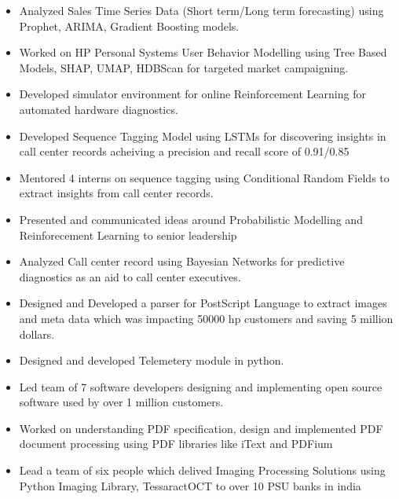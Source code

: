 \documentclass[10pt,a4paper,ragged2e,withhyper]{altacv}
\begin{document}
\begin{paracol}{1}
\par\divider
{}

\begin{itemize}
\item Analyzed Sales Time Series Data (Short term/Long term forecasting) using
Prophet, ARIMA, Gradient Boosting models.
\item Worked on HP Personal Systems User Behavior Modelling using Tree Based Models,
SHAP, UMAP, HDBScan for targeted market campaigning.
\item Developed simulator environment for online Reinforcement Learning for
automated hardware diagnostics.
\item Developed Sequence Tagging Model using LSTMs for discovering insights in
call center records acheiving a precision and recall score of 0.91/0.85
\item Mentored 4 interns on sequence tagging using Conditional Random Fields to
extract insights from call center records.
\item Presented and communicated ideas around Probabilistic Modelling and
Reinforecement Learning to senior leadership
\item Analyzed Call center record using Bayesian Networks for predictive diagnostics
as an aid to call center executives.
\end{itemize}


\newpage
\par\divider
{}
\begin{itemize}
\item Designed and Developed a parser for PostScript Language to extract images and
meta data which was impacting 50000 hp customers and saving 5 million dollars.
\item Designed and developed Telemetery module in python.
\item Led team of 7 software developers designing and implementing open source
software used by over 1 million customers.
\item Worked on understanding PDF specification, design and implemented PDF document
processing using PDF libraries like iText and PDFium
\item Lead a team of six people which delived Imaging Processing Solutions using
Python Imaging Library, TessaractOCT to over 10 PSU banks in india
\end{itemize}


\end{paracol}
\end{document}
